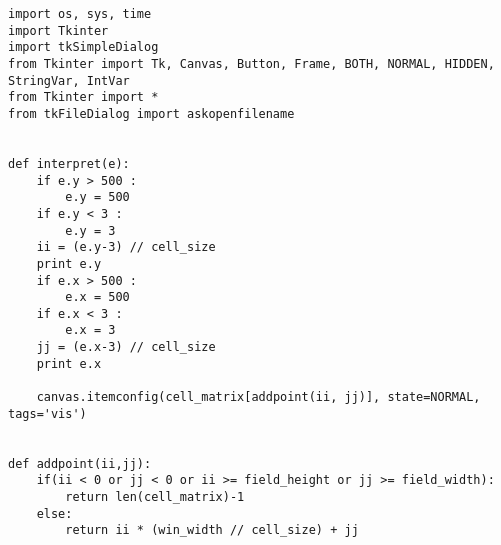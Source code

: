 \documentclass{article}
\begin{document}
\begin{verbatim}
import os, sys, time
import Tkinter
import tkSimpleDialog
from Tkinter import Tk, Canvas, Button, Frame, BOTH, NORMAL, HIDDEN, StringVar, IntVar
from Tkinter import *
from tkFileDialog import askopenfilename


def interpret(e):	
	if e.y > 500 :
		e.y = 500
 	if e.y < 3 :
		e.y = 3
	ii = (e.y-3) // cell_size
	print e.y
	if e.x > 500 :
		e.x = 500 
	if e.x < 3 :
		e.x = 3
	jj = (e.x-3) // cell_size
	print e.x

	canvas.itemconfig(cell_matrix[addpoint(ii, jj)], state=NORMAL, tags='vis')


def addpoint(ii,jj):
	if(ii < 0 or jj < 0 or ii >= field_height or jj >= field_width):
		return len(cell_matrix)-1	
	else:
		return ii * (win_width // cell_size) + jj
\end{verbatim}
\end{document}
